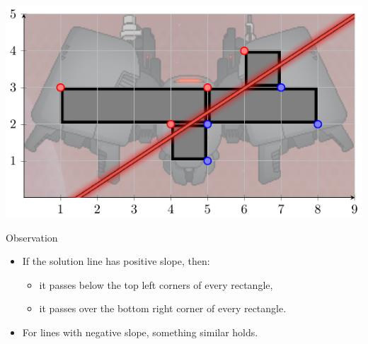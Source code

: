 \begin{frame}
\begin{overprint}
		\centering
		\includegraphics[height=0.4\textheight]{example4}
	\end{overprint}
    \pause
    \begin{block}{Observation}
    	\begin{itemize}
    	\item<+-> If the solution line has positive slope, then:
    	 	\begin{itemize}
    		\item<+-> it passes below the top left corners of every rectangle,
    		\item<+-> it passes over the bottom right corner of every rectangle.
    		\end{itemize}
    	\item<+-> For lines with negative slope, something similar holds.
    	\end{itemize}
    \end{block}
\end{frame}

